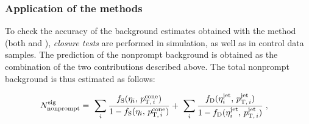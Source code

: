 \subsubsection{Application of the \ttol methods}\label{sec:frChecks}
To check the accuracy of the background estimates obtained with the
\ttol method (both \fr and \Dfr), \emph{closure tests} are
performed in simulation, as well as in control data samples. 
The prediction of the nonprompt background is obtained as the
combination of the two contributions described above. The total
nonprompt background is thus estimated as follows:
\begin{linenomath}
  \begin{align*}
    N_{\mathrm{nonprompt}}^{\mathrm{sig}} & =~ 
    \sum_i\frac{f_{\mathrm{S}}(\eta_i,\,p_{\mathrm{T,\,}i}^{\mathrm{cone}})}{1-f_{\mathrm{S}}(\eta_i,\,p_{\mathrm{T,\,}i}^{\mathrm{cone}})}
    +~
    \sum_i\frac{f_{\mathrm{D}}(\eta^{\mathrm{jet}}_i,\,p_{\mathrm{T,\,}i}^{\mathrm{jet}})}{1-f_{\mathrm{D}}(\eta^{\mathrm{jet}}_i,\,p_{\mathrm{T,\,}i}^{\mathrm{jet}})}\;,
  \end{align*}
\end{linenomath}

